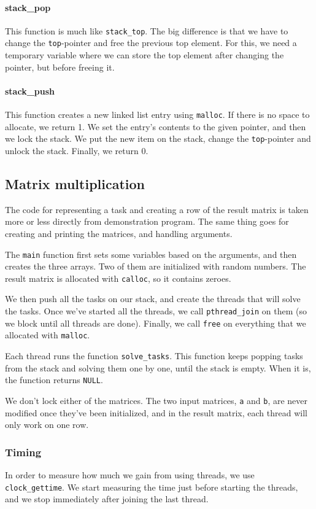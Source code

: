 \documentclass{article}
\begin{document}
\paragraph{stack\_pop}
This function is much like \texttt{stack\_top}. The big difference is that we have to change the \texttt{top}-pointer and free the previous top element. For this, we need a temporary variable where we can store the top element after changing the pointer, but before freeing it.

\paragraph{stack\_push}
This function creates a new linked list entry using \texttt{malloc}. If there is no space to allocate, we return 1. We set the entry's contents to the given pointer, and then we lock the stack. We put the new item on the stack, change the \texttt{top}-pointer and unlock the stack. Finally, we return 0.

\subsection{Matrix multiplication}
The code for representing a task and creating a row of the result matrix is taken more or less directly from demonstration program. The same thing goes for creating and printing the matrices, and handling arguments.

The \texttt{main} function first sets some variables based on the arguments, and then creates the three arrays. Two of them are initialized with random numbers. The result matrix is allocated with \texttt{calloc}, so it contains zeroes.

We then push all the tasks on our stack, and create the threads that will solve the tasks. Once we've started all the threads, we call \texttt{pthread\_join} on them (so we block until all threads are done). Finally, we call \texttt{free} on everything that we allocated with \texttt{malloc}.

Each thread runs the function \texttt{solve\_tasks}. This function keeps popping tasks from the stack and solving them one by one, until the stack is empty. When it is, the function returns \texttt{NULL}.

We don't lock either of the matrices. The two input matrices, \texttt{a} and \texttt{b}, are never modified once they've been initialized, and in the result matrix, each thread will only work on one row.

\subsubsection{Timing}
In order to measure how much we gain from using threads, we use \texttt{clock\_gettime}. We start measuring the time just before starting the threads, and we stop immediately after joining the last thread.
\end{document}
